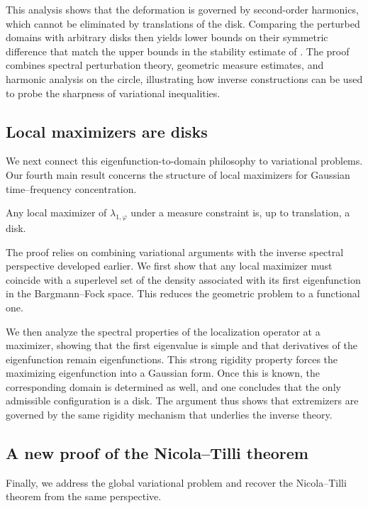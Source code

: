 This analysis shows that the deformation is governed by second-order harmonics, which cannot be eliminated by translations of the disk. Comparing the perturbed domains with arbitrary disks then yields lower bounds on their symmetric difference that match the upper bounds in the stability estimate of \cite{Gomez-Guerra-Ramos-Tilli}. The proof combines spectral perturbation theory, geometric measure estimates, and harmonic analysis on the circle, illustrating how inverse constructions can be used to probe the sharpness of variational inequalities.

\subsection{Local maximizers are disks}

We next connect this eigenfunction-to-domain philosophy to variational problems. Our fourth main result concerns the structure of local maximizers for Gaussian time--frequency concentration.

\begin{theorem}
Any local maximizer of $\lambda_{1,\varphi}$ under a measure constraint is, up to translation, a disk.
\end{theorem}

The proof relies on combining variational arguments with the inverse spectral perspective developed earlier. We first show that any local maximizer must coincide with a superlevel set of the density associated with its first eigenfunction in the Bargmann--Fock space. This reduces the geometric problem to a functional one.

We then analyze the spectral properties of the localization operator at a maximizer, showing that the first eigenvalue is simple and that derivatives of the eigenfunction remain eigenfunctions. This strong rigidity property forces the maximizing eigenfunction into a Gaussian form. Once this is known, the corresponding domain is determined as well, and one concludes that the only admissible configuration is a disk. The argument thus shows that extremizers are governed by the same rigidity mechanism that underlies the inverse theory.

\subsection{A new proof of the Nicola--Tilli theorem}

Finally, we address the global variational problem and recover the Nicola--Tilli theorem from the same perspective.

